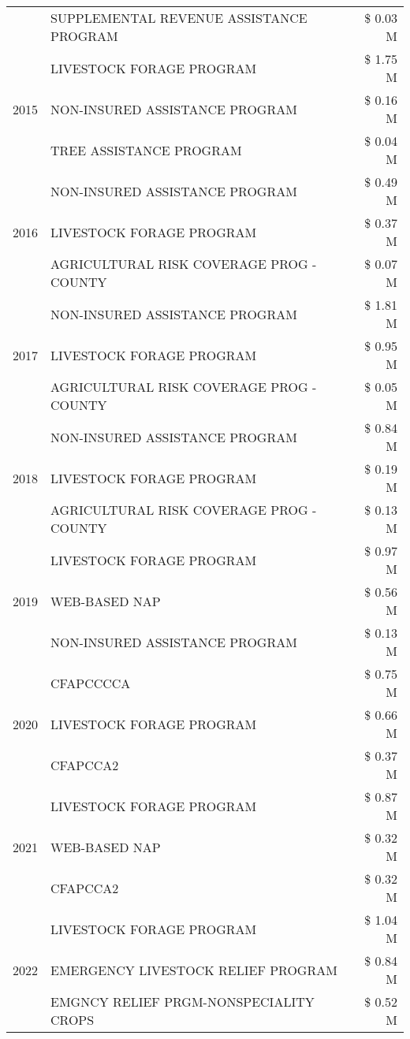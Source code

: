 \begin{tabular}{llr}
 & SUPPLEMENTAL REVENUE ASSISTANCE PROGRAM & \$ 0.03 M \\
\cline{1-3}
\multirow[t]{3}{*}{2015} & LIVESTOCK FORAGE PROGRAM & \$ 1.75 M \\
 & NON-INSURED ASSISTANCE PROGRAM & \$ 0.16 M \\
 & TREE ASSISTANCE PROGRAM & \$ 0.04 M \\
\cline{1-3}
\multirow[t]{3}{*}{2016} & NON-INSURED ASSISTANCE PROGRAM & \$ 0.49 M \\
 & LIVESTOCK FORAGE PROGRAM & \$ 0.37 M \\
 & AGRICULTURAL RISK COVERAGE PROG - COUNTY & \$ 0.07 M \\
\cline{1-3}
\multirow[t]{3}{*}{2017} & NON-INSURED ASSISTANCE PROGRAM & \$ 1.81 M \\
 & LIVESTOCK FORAGE PROGRAM & \$ 0.95 M \\
 & AGRICULTURAL RISK COVERAGE PROG - COUNTY & \$ 0.05 M \\
\cline{1-3}
\multirow[t]{3}{*}{2018} & NON-INSURED ASSISTANCE PROGRAM & \$ 0.84 M \\
 & LIVESTOCK FORAGE PROGRAM & \$ 0.19 M \\
 & AGRICULTURAL RISK COVERAGE PROG - COUNTY & \$ 0.13 M \\
\cline{1-3}
\multirow[t]{3}{*}{2019} & LIVESTOCK FORAGE PROGRAM & \$ 0.97 M \\
 & WEB-BASED NAP & \$ 0.56 M \\
 & NON-INSURED ASSISTANCE PROGRAM & \$ 0.13 M \\
\cline{1-3}
\multirow[t]{3}{*}{2020} & CFAPCCCCA & \$ 0.75 M \\
 & LIVESTOCK FORAGE PROGRAM & \$ 0.66 M \\
 & CFAPCCA2 & \$ 0.37 M \\
\cline{1-3}
\multirow[t]{3}{*}{2021} & LIVESTOCK FORAGE PROGRAM & \$ 0.87 M \\
 & WEB-BASED NAP & \$ 0.32 M \\
 & CFAPCCA2 & \$ 0.32 M \\
\cline{1-3}
\multirow[t]{3}{*}{2022} & LIVESTOCK FORAGE PROGRAM & \$ 1.04 M \\
 & EMERGENCY LIVESTOCK RELIEF PROGRAM & \$ 0.84 M \\
 & EMGNCY RELIEF PRGM-NONSPECIALITY CROPS & \$ 0.52 M \\
\cline{1-3}
\bottomrule
\end{tabular}
